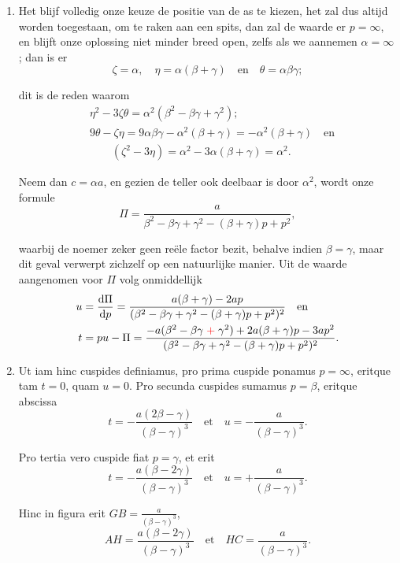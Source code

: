 \documentclass[10pt,a4paper]{article}
\newcommand{\switchenum}{\setcounter{enumi}{\arabic{enumi}-1}\switchcolumn}
\def\D{\mathrm{d}}
\begin{document}
\begin{paracol}{2}
\begin{enumerate}[topsep=1px]
		\switchenum
		\item Het blijf volledig onze keuze de positie van de as te kiezen, het zal dus altijd worden toegestaan, om te raken aan een spits, dan zal de waarde er $p=\infty$, en blijft onze oplossing niet minder breed open, zelfs als we aannemen $\alpha = \infty$; dan is er
		\[
			\zeta = \alpha, \quad \eta = \alpha(\beta+ \gamma)\quad \text{en}\quad  \theta = \alpha \beta \gamma;
		\]
		\par dit is de reden waarom
		\begin{align*}
			&\eta^2 - 3\zeta \theta = \alpha^2 (\beta^2 - \beta \gamma + \gamma^2);\\
			&9\theta - \zeta\eta = 9\alpha \beta \gamma - \alpha^2(\beta + \gamma) = - \alpha^2 (\beta + \gamma)\quad \text{en}\\
			&\qquad (\zeta^2 - 3\eta) = \alpha^2 - 3\alpha (\beta + \gamma) = \alpha^2.
		\end{align*}
		\par Neem dan $c= \alpha a$, en gezien de teller ook deelbaar is door $\alpha^2$, wordt onze formule
		\[
			\Pi = \frac{a}{\beta^2 -\beta \gamma+\gamma^2 -(\beta + \gamma)p + p^2},
		\]
		\par waarbij de noemer zeker geen reële factor bezit, behalve indien $\beta = \gamma$, maar dit geval verwerpt zichzelf op een natuurlijke manier. Uit de waarde aangenomen voor $\Pi$ volg onmiddellijk
		\begin{align*}
			u &= \frac{\D \Pi}{\D p} = \frac{a(\beta + \gamma)-2ap}{(\beta^2 -\beta \gamma +\gamma^2 - (\beta+\gamma)p+p^2)^2} \quad \text{en}\\
			t & = pu - \Pi = \frac{-a(\beta^2 - \beta \gamma\;{\color{red}+}\;\gamma^2)+2a(\beta+\gamma)p -3ap^2}{(\beta^2 - \beta \gamma + \gamma^2 -(\beta + \gamma)p+p^2)^2}.
		\end{align*}
		\switchcolumn*
		
		\item Ut iam hinc cuspides definiamus, pro prima cuspide ponamus $p = \infty$, eritque tam $t= 0$, quam $u=0$. Pro secunda cuspides sumamus $p=\beta$, eritque abscissa
		\[
			t = -\frac{a(2\beta- \gamma)}{(\beta - \gamma)^3} \quad \text{et} \quad u = - \frac{a}{(\beta-\gamma)^3}.
		\]
		\par Pro tertia vero cuspide fiat $p=\gamma$, et erit
		\[
			t = -\frac{a(\beta - 2\gamma)}{(\beta-\gamma)^3} \quad \text{et}\quad u = +\frac{a}{(\beta-\gamma)^3}.
		\]
		\par Hinc in figura erit $GB = \frac{a}{(\beta - \gamma)^3}$,
		\[
			AH = \frac{a(\beta - 2\gamma)}{(\beta - \gamma)^3} \quad \text{et}\quad HC = \frac{a}{(\beta - \gamma)^3}.
		\]
		

\end{enumerate}
\end{paracol}
\end{document}
